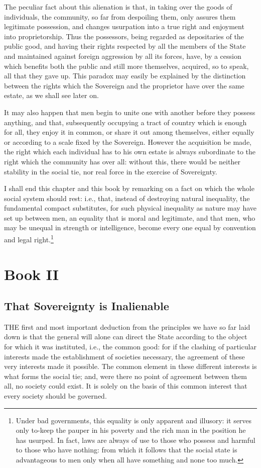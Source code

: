 \documentclass[12pt]{report}
\newcommand{\mychapter}[2]{
\setcounter{chapter}{#1}
    \setcounter{section}{0}
    \chapter*{#2}
    \addcontentsline{toc}{chapter}{#2}
}
\begin{document}
The peculiar fact about this alienation is that, in taking over the goods of individuals, the community, so far from despoiling them, only assures them legitimate possession, and changes usurpation into a true right and enjoyment into proprietorship. Thus the possessors, being regarded as depositaries of the public good, and having their rights respected by all the members of the State and maintained against foreign aggression by all its forces, have, by a cession which benefits both the public and still more themselves, acquired, so to speak, all that they gave up. This paradox may easily be explained by the distinction between the rights which the Sovereign and the proprietor have over the same estate, as we shall see later on.

It may also happen that men begin to unite one with another before they possess anything, and that, subsequently occupying a tract of country which is enough for all, they enjoy it in common, or share it out among themselves, either equally or according to a scale fixed by the Sovereign. However the acquisition be made, the right which each individual has to his own estate is always subordinate to the right which the community has over all: without this, there would be neither stability in the social tie, nor real force in the exercise of Sovereignty.

I shall end this chapter and this book by remarking on a fact on which the whole social system should rest: i.e., that, instead of destroying natural inequality, the fundamental compact substitutes, for such physical inequality as nature may have set up between men, an equality that is moral and legitimate, and that men, who may be unequal in strength or intelligence, become every one equal by convention and legal right.\footnote{Under bad governments, this equality is only apparent and illusory: it serves only to-keep the pauper in his poverty and the rich man in the position he has usurped. In fact, laws are always of use to those who possess and harmful to those who have nothing: from which it follows that the social state is advantageous to men only when all have something and none too much.}

\mychapter{2}{Book II}
\section{That Sovereignty is Inalienable}
THE first and most important deduction from the principles we have so far laid down is that the general will alone can direct the State according to the object for which it was instituted, i.e., the common good: for if the clashing of particular interests made the establishment of societies necessary, the agreement of these very interests made it possible. The common element in these different interests is what forms the social tie; and, were there no point of agreement between them all, no society could exist. It is solely on the basis of this common interest that every society should be governed.
\end{document}
